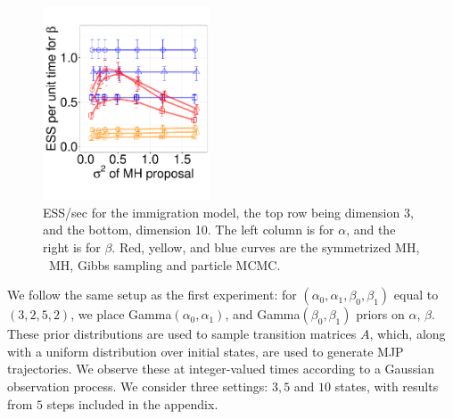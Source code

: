 {\begin{figure}
\begin{minipage}[hp]{0.65\linewidth}
    \includegraphics [width=0.44\textwidth, angle=0]{figs/q_10_beta.pdf}
  \end{minipage}
  \begin{minipage}[!hp]{0.33\linewidth}
    \caption{ESS/sec for the immigration model, the top row being dimension 3, and the bottom,
      dimension 10. The left column is for $\alpha$, and the 
    right is for $\beta$. Red, yellow, and blue curves are the symmetrized MH,
  \naive\ MH, Gibbs sampling and particle MCMC.}
     \label{fig:ESS_Q_D10}
  \end{minipage}
  \vspace{-.4in}
  \end{figure}
We follow the same setup as the first experiment:
for $(\alpha_0,\alpha_1,\beta_0,\beta_1)$ equal to $(3,2,5,2)$,
we place Gamma$(\alpha_0,\alpha_1)$, and Gamma$(\beta_0, \beta_1)$ priors on 
$\alpha$, $\beta$. These prior distributions are used to sample transition 
matrices $A$, which, along with a uniform distribution over initial states,
are used to generate MJP trajectories. We observe these at integer-valued
times according to a Gaussian observation process.
We consider three settings: $3, 5$ and $10$ states, with results from $5$ 
steps included in the appendix. 

}
